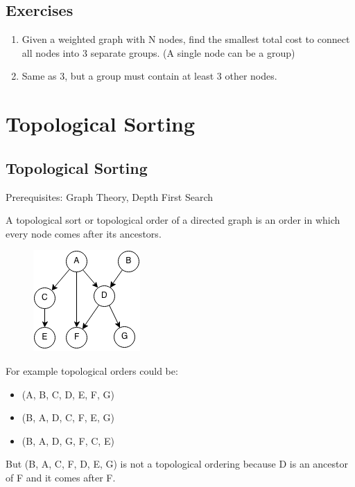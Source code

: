 \documentclass[11pt,oneside]{book}
\makeatletter
\def\maxwidth#1{\ifdim\Gin@nat@width>#1 #1\else\Gin@nat@width\fi}
\makeatother
\begin{document}
        \section{ Exercises }
        

\begin{enumerate}
\item Given a weighted graph with N nodes, find the smallest total cost to connect all nodes into 3 separate groups. (A single node can be a group)
\item Same as 3, but a group must contain at least 3 other nodes.
\end{enumerate}

    \chapter{ Topological Sorting }
        \section{ Topological Sorting }
        

Prerequisites: Graph Theory, Depth First Search

A topological sort or topological order of a directed graph is an order in which every node comes after its ancestors.

\vspace{5px}\begin{figure}[H]\centering
        \includegraphics[width=0.66\maxwidth{\textwidth}]{topsort.png}
        \end{figure}

For example topological orders could be:

\begin{itemize}
\item (A, B, C, D, E, F, G)
\item (B, A, D, C, F, E, G)
\item (B, A, D, G, F, C, E)
\end{itemize}

But (B, A, C, F, D, E, G) is not a topological ordering because D is an ancestor of F and it comes after F.
\end{document}
